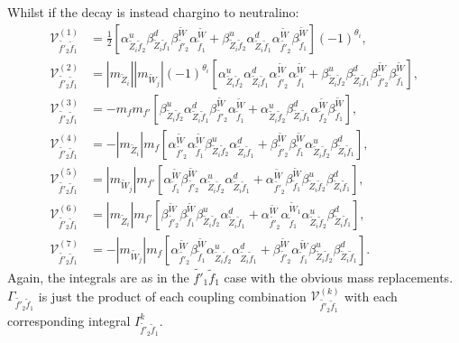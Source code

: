 \documentclass[final,3p,times]{elsarticle}
\begin{document}
Whilst if the decay is instead chargino to neutralino:
\begin{align}
\mathcal{V}_{\tilde{f'}_2 \tilde{f}_1}^{(1)} &= \frac{1}{2}\left[\alpha_{\tilde{Z}_i \tilde{f}_2}^{u} \beta_{\tilde{Z}_i \tilde{f}_1}^{d} \beta_{\tilde{f'}_2}^{\tilde{W}}\alpha_{\tilde{f}_1}^{\tilde{W}} + \beta_{\tilde{Z}_i \tilde{f}_2}^{u} \alpha_{\tilde{Z}_i \tilde{f}_1}^{d} \alpha_{\tilde{f'}_2}^{\tilde{W}} \beta_{\tilde{f}_1}^{\tilde{W}}\right](-1)^{\theta_i}, \\
\mathcal{V}_{\tilde{f'}_2 \tilde{f}_1}^{(2)} &= |m_{\tilde{Z}_i}||m_{\tilde{W}_j}|(-1)^{\theta_i}\left[ \alpha_{\tilde{Z}_i \tilde{f}_2}^{u} \alpha_{\tilde{Z}_i \tilde{f}_1}^{d} \alpha_{\tilde{f'}_2}^{\tilde{W}} \alpha_{\tilde{f}_1}^{\tilde{W}} + \beta_{\tilde{Z}_i \tilde{f}_2}^{u} \beta_{\tilde{Z}_{i} \tilde{f}_1}^{d} \beta_{\tilde{f'}_2}^{\tilde{W}} \beta_{\tilde{f}_1}^{\tilde{W}}\right], \\
\mathcal{V}_{\tilde{f'}_2 \tilde{f}_1}^{(3)} &= -m_{f}m_{f'}\left[\beta_{\tilde{Z}_i \tilde{f}_2}^{u} \alpha_{\tilde{Z}_i \tilde{f}_1}^{d} \beta_{\tilde{f'}_2}^{\tilde{W}} \alpha_{\tilde{f}_1}^{\tilde{W}} +  \alpha_{\tilde{Z}_i \tilde{f}_2}^{u} \beta_{\tilde{Z}_i \tilde{f}_1}^{d} \alpha_{\tilde{f}_2}^{\tilde{W}} \beta_{\tilde{f}_1}^{\tilde{W}}\right], \\
\mathcal{V}_{\tilde{f'}_2 \tilde{f}_1}^{(4)} &= -|m_{\tilde{Z}_i}| m_{f} \left[\alpha_{\tilde{f'}_2}^{\tilde{W}} \alpha_{\tilde{f}_1}^{\tilde{W}} \beta_{\tilde{Z}_i \tilde{f}_2}^{u} \alpha_{\tilde{Z}_i \tilde{f}_1}^{d} + \beta_{\tilde{f'}_2}^{\tilde{W}} \beta_{\tilde{f}_1}^{\tilde{W}} \alpha_{\tilde{Z}_i \tilde{f}_2}^{u} \beta_{\tilde{Z}_i \tilde{f}_1}^{d}\right] ,\\
\mathcal{V}_{\tilde{f'}_2 \tilde{f}_1}^{(5)} &= |m_{\tilde{W}_j}|m_{f'} \left[\alpha_{\tilde{f}_1}^{\tilde{W}} \beta_{\tilde{f'}_2}^{\tilde{W}} \alpha_{\tilde{Z}_i \tilde{f}_2}^{u} \alpha_{\tilde{Z}_i \tilde{f}_1}^{d} + \alpha_{\tilde{f'}_2}^{\tilde{W}} \beta_{\tilde{f}_1}^{\tilde{W}} \beta_{\tilde{Z}_i \tilde{f}_2}^{u} \beta_{\tilde{Z}_i \tilde{f}_1}^{d}\right],\\
\mathcal{V}_{\tilde{f'}_2 \tilde{f}_1}^{(6)} &= |m_{\tilde{Z}_i}| m_{f'}\left[\beta_{\tilde{f'}_2}^{\tilde{W}}\beta_{\tilde{f}_1}^{\tilde{W}} \beta_{\tilde{Z}_i \tilde{f}_2}^{u} \alpha_{\tilde{Z}_i \tilde{f}_1}^{d} + \alpha_{\tilde{f'}_2}^{\tilde{W}} \alpha_{\tilde{f}_1}^{\tilde{W}_1} \alpha_{\tilde{Z}_i \tilde{f}_2}^{u} \beta_{\tilde{Z}_i \tilde{f}_1}^{d}\right], \\
\mathcal{V}_{\tilde{f'}_2 \tilde{f}_1}^{(7)} &= -|m_{\tilde{W}_j}|m_{f}\left[\alpha_{\tilde{f'}_2}^{\tilde{W}}\beta_{\tilde{f}_1}^{\tilde{W}} \alpha_{\tilde{Z}_i \tilde{f}_2}^{u} \alpha_{\tilde{Z}_i \tilde{f}_1}^{d} + \beta_{\tilde{f'}_2}^{\tilde{W}} \alpha_{\tilde{f}_1}^{\tilde{W}} \beta_{\tilde{Z}_i \tilde{f}_2}^{u} \beta_{\tilde{Z}_i \tilde{f}_1}^{d}\right].
\end{align}
Again, the integrals are as in the $\tilde{f'}_1 \tilde{f}_1$ case with the obvious mass replacements. $\Gamma_{\tilde{f'}_2 \tilde{f}_1}$ is just the product of each coupling combination $\mathcal{V}_{\tilde{f'}_2 \tilde{f}_1}^{(k)}$ with each corresponding integral $I_{\tilde{f'}_2 \tilde{f}_1}^{k}$.
\end{document}
